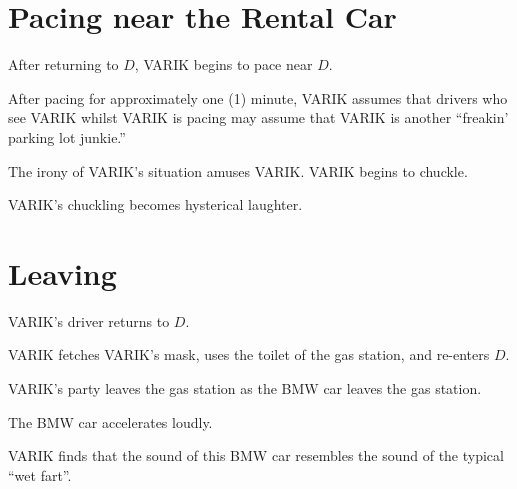 \documentclass{article}
\begin{document}
	\section{Pacing near the Rental Car}
		After returning to $D$, VARIK begins to pace near $D$.

		After pacing for approximately one (1) minute, VARIK assumes that
		drivers who see VARIK whilst VARIK is pacing may assume that VARIK
		is another ``freakin' parking lot junkie.''

		The irony of VARIK's situation amuses VARIK\@.  VARIK begins to
		chuckle.

		VARIK's chuckling becomes hysterical laughter.
	\section{Leaving}
		VARIK's driver returns to $D$.

		VARIK fetches VARIK's mask, uses the toilet of the gas station, and
		re-enters $D$.

		VARIK's party leaves the gas station as the BMW car leaves the gas
		station.

		The BMW car accelerates loudly.

		VARIK finds that the sound of this BMW car resembles the sound of
		the typical ``wet fart''.
\end{document}
